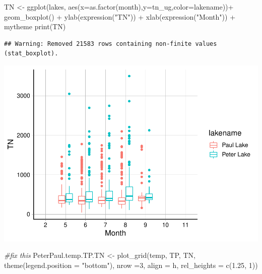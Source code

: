 \documentclass[
]{article}
\newenvironment{Shaded}{\begin{snugshade}}{\end{snugshade}}
\newcommand{\AttributeTok}[1]{\textcolor[rgb]{0.77,0.63,0.00}{#1}}
\newcommand{\CommentTok}[1]{\textcolor[rgb]{0.56,0.35,0.01}{\textit{#1}}}
\newcommand{\DecValTok}[1]{\textcolor[rgb]{0.00,0.00,0.81}{#1}}
\newcommand{\FloatTok}[1]{\textcolor[rgb]{0.00,0.00,0.81}{#1}}
\newcommand{\FunctionTok}[1]{\textcolor[rgb]{0.00,0.00,0.00}{#1}}
\newcommand{\NormalTok}[1]{#1}
\newcommand{\OtherTok}[1]{\textcolor[rgb]{0.56,0.35,0.01}{#1}}
\newcommand{\SpecialCharTok}[1]{\textcolor[rgb]{0.00,0.00,0.00}{#1}}
\newcommand{\StringTok}[1]{\textcolor[rgb]{0.31,0.60,0.02}{#1}}
\begin{document}
\begin{Shaded}
\begin{Highlighting}[]
\NormalTok{TN }\OtherTok{\textless{}{-}} \FunctionTok{ggplot}\NormalTok{(lakes, }\FunctionTok{aes}\NormalTok{(}\AttributeTok{x=}\FunctionTok{as.factor}\NormalTok{(month),}\AttributeTok{y=}\NormalTok{tn\_ug,}\AttributeTok{color=}\NormalTok{lakename))}\SpecialCharTok{+}
  \FunctionTok{geom\_boxplot}\NormalTok{() }\SpecialCharTok{+} 
  \FunctionTok{ylab}\NormalTok{(}\FunctionTok{expression}\NormalTok{(}\StringTok{"TN"}\NormalTok{)) }\SpecialCharTok{+}
  \FunctionTok{xlab}\NormalTok{(}\FunctionTok{expression}\NormalTok{(}\StringTok{"Month"}\NormalTok{)) }\SpecialCharTok{+} 
\NormalTok{  mytheme}
\FunctionTok{print}\NormalTok{(TN)}
\end{Highlighting}
\end{Shaded}

\begin{verbatim}
## Warning: Removed 21583 rows containing non-finite values (stat_boxplot).
\end{verbatim}

\includegraphics{A05_DataVisualization_files/figure-latex/unnamed-chunk-4-3.pdf}

\begin{Shaded}
\begin{Highlighting}[]
\CommentTok{\#fix this }
\NormalTok{PeterPaul.temp.TP.TN }\OtherTok{\textless{}{-}} \FunctionTok{plot\_grid}\NormalTok{(temp, TP, TN, }\FunctionTok{theme}\NormalTok{(}\AttributeTok{legend.position =} \StringTok{"bottom"}\NormalTok{), }\AttributeTok{nrow =}\DecValTok{3}\NormalTok{, }\AttributeTok{align =} \StringTok{\textquotesingle{}h\textquotesingle{}}\NormalTok{, }\AttributeTok{rel\_heights =} \FunctionTok{c}\NormalTok{(}\FloatTok{1.25}\NormalTok{, }\DecValTok{1}\NormalTok{))}
\end{Highlighting}
\end{Shaded}
\end{document}
